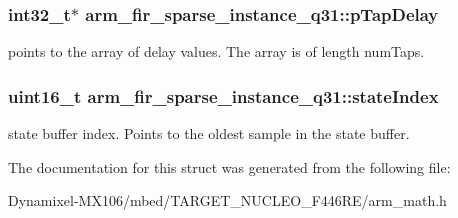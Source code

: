 \subsubsection[{\texorpdfstring{p\+Tap\+Delay}{pTapDelay}}]{\setlength{\rightskip}{0pt plus 5cm}int32\+\_\+t$\ast$ arm\+\_\+fir\+\_\+sparse\+\_\+instance\+\_\+q31\+::p\+Tap\+Delay}\hypertarget{structarm__fir__sparse__instance__q31_ab87ae457adec8f727afefaa2599fc983}{}\label{structarm__fir__sparse__instance__q31_ab87ae457adec8f727afefaa2599fc983}
points to the array of delay values. The array is of length num\+Taps. 
\subsubsection[{\texorpdfstring{state\+Index}{stateIndex}}]{\setlength{\rightskip}{0pt plus 5cm}uint16\+\_\+t arm\+\_\+fir\+\_\+sparse\+\_\+instance\+\_\+q31\+::state\+Index}\hypertarget{structarm__fir__sparse__instance__q31_a557ed9d477e76e4ad2019344f19f568a}{}\label{structarm__fir__sparse__instance__q31_a557ed9d477e76e4ad2019344f19f568a}
state buffer index. Points to the oldest sample in the state buffer. 

The documentation for this struct was generated from the following file\+:\begin{DoxyCompactItemize}
\item 
Dynamixel-\/\+M\+X106/mbed/\+T\+A\+R\+G\+E\+T\+\_\+\+N\+U\+C\+L\+E\+O\+\_\+\+F446\+R\+E/arm\+\_\+math.\+h\end{DoxyCompactItemize}
